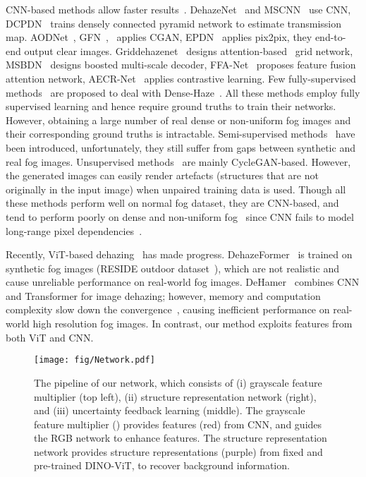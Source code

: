 \documentclass[runningheads]{llncs}
\begin{document}
CNN-based methods allow faster results~\cite{li2017haze,ye2021perceiving,lin2020gait,lin2021gait}.
DehazeNet~\cite{cai2016dehazenet} and MSCNN~\cite{ren2016single} use CNN, DCPDN~\cite{zhang2018densely} trains densely connected pyramid network to estimate transmission map.
AODNet~\cite{li2017aod}, GFN~\cite{ren2018gated},~\cite{li2018single} applies CGAN, EPDN~\cite{qu2019enhanced} applies pix2pix, they end-to-end output clear images.
Griddehazenet~\cite{liu2019griddehazenet} designs attention-based~\cite{jin2021dc} grid network, MSBDN~\cite{dong2020multi} designs boosted multi-scale decoder, FFA-Net~\cite{qin2020ffa} proposes feature fusion attention network, AECR-Net~\cite{wu2021contrastive} applies contrastive learning. 
Few fully-supervised methods~\cite{dudhane2019ri,bianco2019high,morales2019feature} are proposed to deal with Dense-Haze~\cite{ancuti2019dense}.
All these methods employ fully supervised learning and hence require ground truths to train their networks. 
However, obtaining a large number of real dense or non-uniform fog images and their corresponding ground truths is intractable. 
Semi-supervised methods~\cite{li2019semi,shao2020domain,chen2021psd,li2022physically} have been introduced, 
unfortunately, they still suffer from gaps between synthetic and real fog images.
Unsupervised methods~\cite{huang2019towards,golts2019unsupervised,li2021you,zhao2021refinednet,yang2022self} are mainly CycleGAN-based.
However, the generated images can easily render artefacts (structures that are not originally in the input image) when unpaired training data is used.
Though all these methods perform well on normal fog dataset, they are CNN-based, and tend to perform poorly on dense and non-uniform fog~\cite{guo2022image} since CNN fails to model long-range pixel dependencies~\cite{dosovitskiy2020image}.
 
Recently, ViT-based dehazing~\cite{guo2022image,song2022vision} has made progress.
DehazeFormer~\cite{song2022vision} is trained on synthetic fog images (RESIDE outdoor dataset~\cite{li2018benchmarking}), which are not realistic and cause unreliable performance on real-world fog images.
DeHamer~\cite{guo2022image} combines CNN and Transformer for image dehazing; however, memory and computation complexity slow down the convergence~\cite{zhu2020deformable}, causing inefficient performance on real-world high resolution fog images.
In contrast, our method exploits features from both ViT and CNN.

\begin{figure*}[t!]
	\centering
	{\texttt{[image: fig/Network.pdf]}}\hfill
	\caption{The pipeline of our network, which consists of (i) grayscale feature multiplier (top left), (ii) structure representation network (right), and (iii) uncertainty feedback learning (middle).
	The grayscale feature multiplier () provides features (red) from CNN, and guides the RGB network to enhance features. 
	The structure representation network provides structure representations (purple) from fixed and pre-trained DINO-ViT, to recover background information.}
	\label{fig:pipeline}
\end{figure*}
\end{document}
